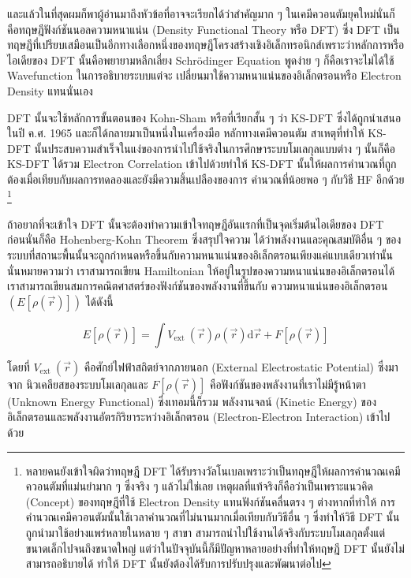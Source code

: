 และแล้วในที่สุดผมก็พาผู้อ่านมาถึงหัวข้อที่อาจจะเรียกได้ว่าสำคัญมาก ๆ ในเคมีควอนตัมยุคใหม่นั่นก็คือทฤษฎีฟังก์ชันนอลความหนาแน่น (Density
Functional Theory หรือ DFT) ซึ่ง DFT เป็นทฤษฎีที่เปรียบเสมือนเป็นอีกทางเลือกหนึ่งของทฤษฎีโครงสร้างเชิงอิเล็กทรอนิกส์เพราะว่าหลักการหรือ%
ไอเดียของ DFT นั้นคือพยายามหลีกเลี่ยง Schr\"{o}dinger Equation พูดง่าย ๆ ก็คือเราจะไม่ได้ใช้ Wavefunction ในการอธิบายระบบแต่จะ%
เปลี่ยนมาใช้ความหนาแน่นของอิเล็กตรอนหรือ Electron Density แทนนั่นเอง

DFT นั้นจะใช้หลักการขั้นตอนของ Kohn-Sham หรือที่เรียกสั้น ๆ ว่า KS-DFT ซึ่งได้ถูกนำเสนอในปี ค.ศ. 1965 และก็ได้กลายมาเป็นหนึ่งในเครื่องมือ%
หลักทางเคมีควอนตัม สาเหตุที่ทำให้ KS-DFT นั้นประสบความสำเร็จในแง่ของการนำไปใช้จริงในการศึกษาระบบโมเลกุลแบบต่าง ๆ นั้นก็คือ KS-DFT
ได้รวม Electron Correlation เข้าไปด้วยทำให้ KS-DFT นั้นให้ผลการคำนวณที่ถูกต้องเมื่อเทียบกับผลการทดลองและยังมีความสิ้นเปลืองของการ%
คำนวณที่น้อยพอ ๆ กับวิธี HF อีกด้วย%
\footnote{หลายคนยังเข้าใจผิดว่าทฤษฎี DFT ได้รับรางวัลโนเบลเพราะว่าเป็นทฤษฎีให้ผลการคำนวณเคมีควอนตัมที่แม่นยำมาก ๆ ซึ่งจริง ๆ
  แล้วไม่ใช่เลย เหตุผลที่แท้จริงก็คือว่าเป็นเพราะแนวคิด (Concept) ของทฤษฎีที่ใช้ Electron Density แทนฟังก์ชันคลื่นตรง ๆ ต่างหากที่ทำให้%
  การคำนวณเคมีควอนตัมนั้นใช้เวลาคำนวณที่ไม่นานมากเมื่อเทียบกับวิธีอื่น ๆ ซึ่งทำให้วิธี DFT นั้นถูกนำมาใช้อย่างแพร่หลายในหลาย ๆ สาขา
  สามารถนำไปใช้งานได้จริงกับระบบโมเลกุลตั้งแต่ขนาดเล็กไปจนถึงขนาดใหญ่ แต่ว่าในปัจจุบันนี้ก็มีปัญหาหลายอย่างที่ทำให้ทฤษฎี DFT
  นั้นยังไม่สามารถอธิบายได้ ทำให้ DFT นั้นยังต้องได้รับการปรับปรุงและพัฒนาต่อไป}

ถ้าอยากที่จะเข้าใจ DFT นั้นจะต้องทำความเข้าใจทฤษฎีอันแรกที่เป็นจุดเริ่มต้นไอเดียของ DFT ก่อนนั่นก็คือ Hohenberg-Kohn Theorem ซึ่งสรุปใจความ%
ได้ว่าพลังงานและคุณสมบัติอื่น ๆ ของระบบที่สถานะพื้นนั้นจะถูกกำหนดหรือขึ้นกับความหนาแน่นของอิเล็กตรอนเพียงแค่แบบเดียวเท่านั้น นั่นหมายความว่า%
เราสามารถเขียน Hamiltonian ให้อยู่ในรูปของความหนาแน่นของอิเล็กตรอนได้ เราสามารถเขียนสมการคณิตศาสตร์ของฟังก์ชันของพลังงานที่ขึ้นกับ%
ความหนาแน่นของอิเล็กตรอน $(E[\rho(\vec{r})])$ ได้ดังนี้

\begin{equation}
  \label{eq:Energy_Functional_DFT}
  E[\rho(\vec{r})]
  =
  \int V_{\text{ext }}(\vec{r}) \rho(\vec{r}) \mathrm{d} \vec{r}
  + F[\rho(\vec{r})]
\end{equation}

\noindent โดยที่ $V_{\text{ext }}(\vec{r})$ คือศักย์ไฟฟ้าสถิตย์จากภายนอก (External Electrostatic Potential) ซึ่งมาจาก%
นิวเคลียสของระบบโมเลกุลและ $F[\rho(\vec{r})]$ คือฟังก์ชันของพลังงานที่เราไม่มีรู้หน้าตา (Unknown Energy Functional) ซึ่งเทอมนี้ก็รวม%
พลังงานจลน์ (Kinetic Energy) ของอิเล็กตรอนและพลังงานอัตรกิริยาระหว่างอิเล็กตรอน (Electron-Electron Interaction) เข้าไปด้วย

